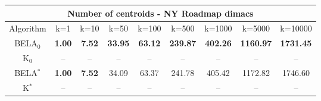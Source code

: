 \begin{tabular}{c|cccccccc}\toprule
\multicolumn{9}{c}{Number of centroids - NY Roadmap dimacs}\\ \midrule
Algorithm & k=1 & k=10 & k=50 & k=100 & k=500 & k=1000 & k=5000 & k=10000 \\ \midrule
BELA$_0$ & \textbf{1.00} & \textbf{7.52} & \textbf{33.95} & \textbf{63.12} & \textbf{239.87} & \textbf{402.26} & \textbf{1160.97} & \textbf{1731.45} \\
K$_0$ & -- & -- & -- & -- & -- & -- & -- & -- \\
BELA$^*$ & \textbf{1.00} & \textbf{7.52} & 34.09 & 63.37 & 241.78 & 405.42 & 1172.82 & 1746.60 \\
K$^*$ & -- & -- & -- & -- & -- & -- & -- & -- \\ \bottomrule 
\end{tabular}
